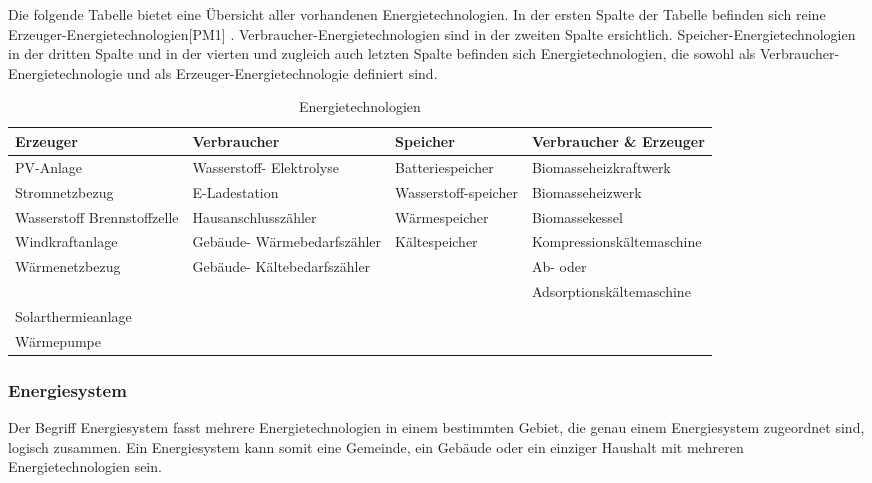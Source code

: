 Die folgende Tabelle bietet eine Übersicht aller vorhandenen Energietechnologien.
In der ersten Spalte der Tabelle befinden sich reine Erzeuger-Energietechnologien[PM1] . Verbraucher-Energietechnologien sind in der zweiten Spalte ersichtlich. Speicher-Energietechnologien in der dritten Spalte und in der vierten und zugleich auch letzten Spalte befinden sich Energietechnologien, die sowohl als Verbraucher-Energietechnologie und als Erzeuger-Energietechnologie definiert sind.
\begin{table}[]
	\begin{tabular}{|l|l|l|l|}
		\hline
		\textbf{Erzeuger} &\textbf{Verbraucher}  & 	\textbf{Speicher}            &  \textbf{Verbraucher \& Erzeuger}           \\ \hline
		PV-Anlage                   & Wasserstoff- Elektrolyse    & Batteriespeicher     & Biomasseheizkraftwerk             \\ \hline
		Stromnetzbezug              & E-Ladestation               & Wasserstoff-speicher & Biomasseheizwerk                  \\ \hline
		Wasserstoff Brennstoffzelle & Hausanschlusszähler         & Wärmespeicher        & Biomassekessel                    \\ \hline
		Windkraftanlage             & Gebäude- Wärmebedarfszähler & Kältespeicher        & Kompressionskältemaschine         \\ \hline
		Wärmenetzbezug              & Gebäude- Kältebedarfszähler &                      & Ab- oder \newline \\ &&&Adsorptionskältemaschine \\ \hline
		Solarthermieanlage          &                             &                      &                                   \\ \hline
		Wärmepumpe                  &                             &                      &                                   \\ \hline
	\end{tabular}
\caption{Energietechnologien}
\label{tab:Energietechnologien}
\end{table}


\newpage
\subsubsection{Energiesystem} \label{sec:Energiesystem}
Der Begriff Energiesystem fasst mehrere Energietechnologien in einem bestimmten Gebiet, die genau einem Energiesystem zugeordnet sind, logisch zusammen. Ein Energiesystem kann somit eine Gemeinde, ein Gebäude oder ein einziger Haushalt mit mehreren Energietechnologien sein.


